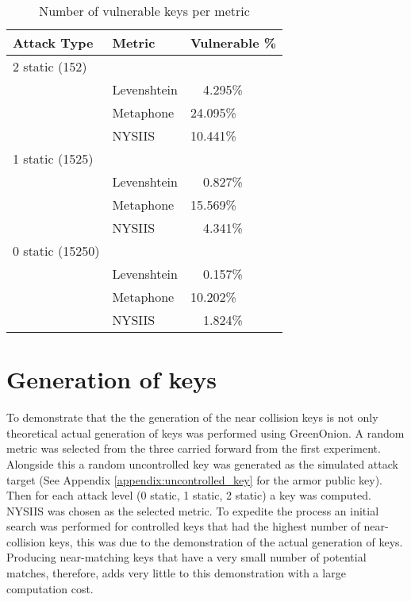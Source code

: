 
\begin{table}[!h]
    \centering
    \begin{tabular}{|lll|}
        \hline
        \textbf{Attack Type} & \textbf{Metric} & \textbf{Vulnerable \%} \\
        \hline 
        2 static (152) && \\ 
        & Levenshtein & ~~4.295\% \\
        & Metaphone & 24.095\% \\
        & NYSIIS & 10.441\% \\
        \hline
        1 static (1525) && \\ 
        & Levenshtein & ~~0.827\% \\
        & Metaphone & 15.569\% \\
        & NYSIIS & ~~4.341\% \\
        \hline
        0 static (15250) && \\ 
        & Levenshtein & ~~0.157\% \\
        & Metaphone & 10.202\% \\
        & NYSIIS & ~~1.824\% \\
        \hline
    \end{tabular}
    \caption{Number of vulnerable keys per metric}
\end{table}



\section{Generation of keys}
To demonstrate that the the generation of the near collision keys is not only theoretical actual generation of keys was performed using GreenOnion. A random metric was selected from the three carried forward from the first experiment. Alongside this a random uncontrolled key was generated as the simulated attack target (See Appendix \ref{appendix:uncontrolled_key} for the armor public key). Then for each attack level (0 static, 1 static, 2 static) a key was computed. NYSIIS was chosen as the selected metric. To expedite the process an initial search was performed for controlled keys that had the highest number of near-collision keys, this was due to the demonstration of the actual generation of keys. Producing near-matching keys that have a very small number of potential matches, therefore, adds very little to this demonstration with a large computation cost.

